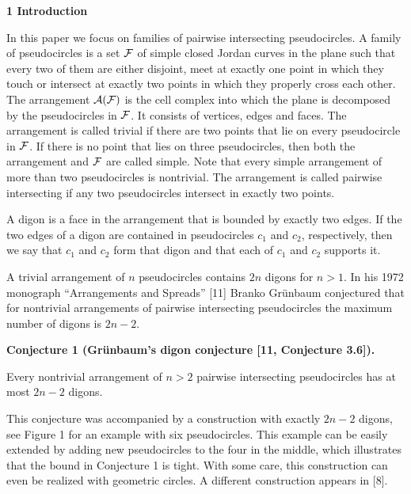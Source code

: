 \par\medskip\noindent\textbf{1 Introduction}\par
In this paper we focus on families of pairwise intersecting pseudocircles. A family of pseudocircles is a set ${\cal{F}}$ of simple closed Jordan curves in the plane such that every two of them are either disjoint, meet at exactly one point in which they touch or intersect at exactly two points in which they properly cross each other. The arrangement ${\cal{A}}({\cal{F}})$ is the cell complex into which the plane is decomposed by the pseudocircles in ${\cal{F}}$. It consists of vertices, edges and faces. The arrangement is called trivial if there are two points that lie on every pseudocircle in ${\cal{F}}$. If there is no point that lies on three pseudocircles, then both the arrangement and ${\cal{F}}$ are called simple. Note that every simple arrangement of more than two pseudocircles is nontrivial. The arrangement is called pairwise intersecting if any two pseudocircles intersect in exactly two points.
\par
\par
A digon is a face in the arrangement that is bounded by exactly two edges. If the two edges of a digon are contained in pseudocircles $c_{1}$ and $c_{2}$, respectively, then we say that $c_{1}$ and $c_{2}$ form that digon and that each of $c_{1}$ and $c_{2}$ supports it.
\par
\par
A trivial arrangement of $n$ pseudocircles contains $2n$ digons for $n>1$. In his 1972 monograph “Arrangements and Spreads” [11] Branko Grünbaum conjectured that for nontrivial arrangements of pairwise intersecting pseudocircles the maximum number of digons is $2n-2$.
\par
\par
\par\medskip\noindent\textbf{Conjecture 1 (Grünbaum’s digon conjecture [11, Conjecture 3.6]).}\par
Every nontrivial arrangement of $n>2$ pairwise intersecting pseudocircles has at most $2n-2$ digons.
\par
\par
\par
This conjecture was accompanied by a construction with exactly $2n-2$ digons, see Figure 1 for an example with six pseudocircles. This example can be easily extended by adding new pseudocircles to the four in the middle, which illustrates that the bound in Conjecture 1 is tight. With some care, this construction can even be realized with geometric circles. A different construction appears in [8].
